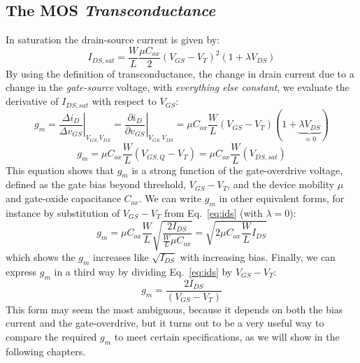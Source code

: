 \subsection{The MOS \textit{Transconductance}}
In saturation the drain-source current is given by:
    \begin{equation}
        {I_{DS,sat}} = \frac{W}{L}\frac{{\mu {C_{ox}}}}{2}{({V_{GS}} - {V_T})^2}(1 + \lambda {V_{DS}})
        \label{eq:ids}
    \end{equation} 
By using the definition of transconductance, the change in drain current due to a change in the \textit{gate-source} voltage, with \textit{everything else constant}, we evaluate the derivative of $I_{DS,sat}$ with respect to $V_{GS}$:
    \begin{equation}
        {g_m} = {\left. {\frac{{\Delta {i_D}}}{{\Delta {v_{GS}}}}} \right|_{{V_{GS,}}{V_{DS}}}} = {\left. {\frac{{\partial {i_D}}}{{\partial {v_{GS}}}}} \right|_{{V_{GS,}}{V_{DS}}}} = \mu {C_{ox}}\frac{W}{L}({V_{GS}} - {V_T})(1 +\underbrace{ \lambda {V_{DS}}}_{\approx 0})
    \end{equation}
    \begin{equation}
        {g_m} = \mu {C_{ox}}\frac{W}{L}({V_{GS,Q}} - {V_T}) = \mu {C_{ox}}\frac{W}{L}(V_{DS,sat})
    \end{equation}
This equation shows that $g_m$ is a strong function of the gate-overdrive voltage, defined as the gate bias beyond threshold, $V_{GS} - V_T$, and the device mobility $\mu$ and gate-oxide capacitance $C_{ox}$.  We can write $g_m$ in other equivalent forms, for instance by substitution of $V_{GS}-V_T$ from Eq.~\ref{eq:ids} (with $\lambda = 0$):
    \begin{equation}
        {g_m} = \mu {C_{ox}}\frac{W}{L}\sqrt {\frac{{2{I_{DS}}}}{{\frac{W}{L}\mu {C_{ox}}}}}  = \sqrt {2\mu{C_{ox}}\frac{W}{L}{I_{DS}}}
    \end{equation}
which shows the $g_m$ increases like $\sqrt{I_{DS}}$ with increasing bias.  Finally, we can express $g_m$ in a third way by dividing Eq.~\ref{eq:ids} by $V_{GS}-V_T$:
    \begin{equation}
        {g_m} = \frac{{2{I_{DS}}}}{{({V_{GS}} - {V_T})}} \label{eq:gm_vstar}
    \end{equation} 
This form may seem the most ambiguous, because it depends on both the bias current and the gate-overdrive, but it turns out to be a very useful way to compare the required $g_m$ to meet certain specifications, as we will show in the following chapters.
